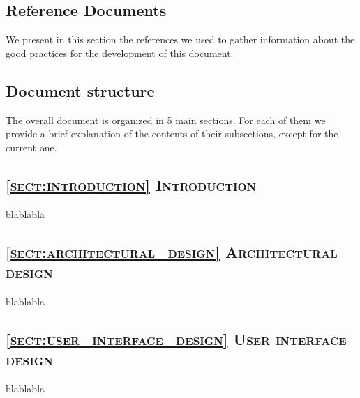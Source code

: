 \subsection{Reference Documents}
\label{sec:ref_docs}
We present in this section the references we used to gather information about the good practices for the development of this document.
\begingroup
\renewcommand{\section}[2]{}%
\nocite{*}


\endgroup





\subsection{Document structure}
\label{sec:doc_struct}
The overall document is organized in 5 main sections. For each of them we provide a brief explanation of the contents of their subsections, except for the current one.

\subsection*{\textsc{\textcolor{myblue}{\ref{sect:introduction} Introduction}}}
blablabla

\subsection*{\textsc{\textcolor{myblue}{\ref{sect:architectural_design} Architectural design}}}
blablabla

\subsection*{\textsc{\textcolor{myblue}{\ref{sect:user_interface_design} User interface design}}}
blablabla

